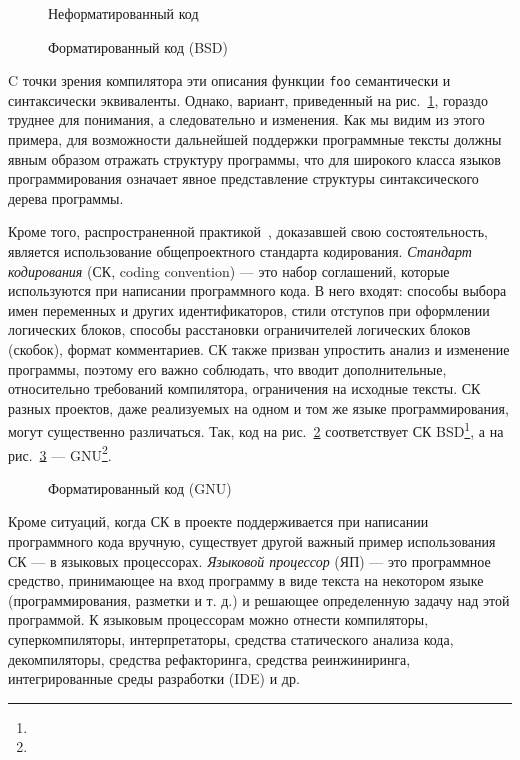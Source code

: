 \begin{figure}[h!]
	\centering
	
	\caption{Неформатированный код}
	\label{fig:wikiExUnfor}
\end{figure}

\begin{figure}[h!]
	\centering
	
  \caption{Форматированный код (BSD)}
	\label{fig:wikiExBSD}
\end{figure}

C точки зрения компилятора
эти описания функции \lstinline[language = Java]{foo}
семантически и синтаксически эквиваленты.
Однако, вариант, приведенный на
рис.~\ref{fig:wikiExUnfor}, гораздо труднее для
понимания, а следовательно и изменения.
Как мы видим из этого примера, для возможности дальнейшей поддержки
программные тексты должны явным образом
отражать структуру программы, что для широкого класса языков
программирования означает явное представление структуры синтаксического
дерева программы.

Кроме того, распространенной практикой~\cite{codingStandarts},
доказавшей свою состоятельность, является использование
общепроектного стандарта кодирования.
\emph{Стандарт кодирования} (СК, coding convention) ---
это набор соглашений, которые используются
при написании программного кода. В него входят: способы выбора имен переменных
и других идентификаторов, стили отступов при оформлении логических блоков,
способы расстановки ограничителей логических блоков (скобок),
формат комментариев. СК также призван упростить анализ и изменение
программы, поэтому его важно соблюдать, что вводит
дополнительные, относительно требований компилятора,
ограничения на исходные тексты. СК разных проектов, даже
реализуемых на одном и том же языке программирования, могут существенно
различаться.
Так, код на рис.~\ref{fig:wikiExBSD} соответствует СК
BSD\footnote{},
а на рис.~\ref{fig:wikiExGNU} ---
GNU\footnote{}.

\begin{figure}[h!]
	\centering
	
  \caption{Форматированный код (GNU)}
	\label{fig:wikiExGNU}
\end{figure}

Кроме ситуаций, когда СК в проекте поддерживается при написании
программного кода вручную, существует другой важный пример использования СК ---
в языковых процессорах. \emph{Языковой процессор} (ЯП) ---
это программное средство, принимающее на вход программу в виде текста
на некотором языке (программирования, разметки и т. д.) и решающее
определенную задачу над этой программой. К языковым процессорам можно
отнести компиляторы, суперкомпиляторы, интерпретаторы,
средства статического анализа кода, декомпиляторы, средства рефакторинга,
средства реинжиниринга, интегрированные среды разработки (IDE) и др.

